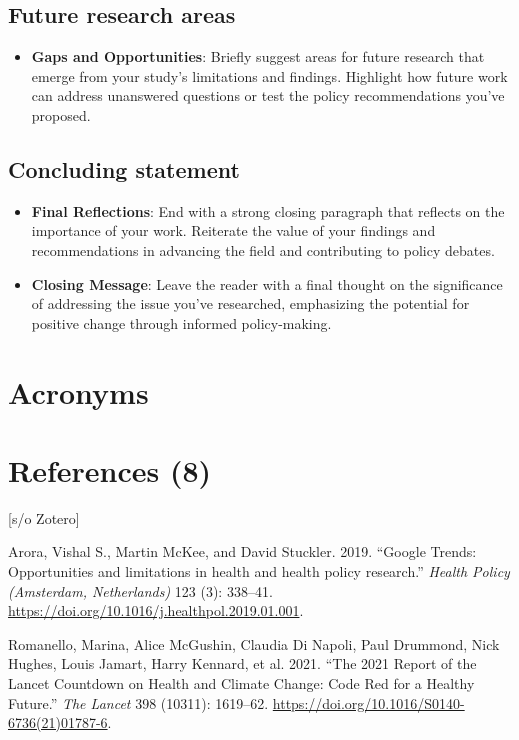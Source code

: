 \documentclass[
  12pt,
]{article}
\providecommand{\tightlist}{%
  \setlength{\itemsep}{0pt}\setlength{\parskip}{0pt}}\usepackage{longtable,booktabs,array}
\newlength{\cslhangindent}
\newenvironment{CSLReferences}[2] %
 {\begin{list}{}{%
  \setlength{\itemindent}{0pt}
  \setlength{\leftmargin}{0pt}
  \setlength{\parsep}{0pt}
  \ifodd #1
   \setlength{\leftmargin}{\cslhangindent}
   \setlength{\itemindent}{-1\cslhangindent}
  \fi
  \setlength{\itemsep}{#2\baselineskip}}}
 {\end{list}}
\begin{document}
\subsection{Future research areas}\label{future-research-areas}

\begin{itemize}
\tightlist
\item
  \textbf{Gaps and Opportunities}: Briefly suggest areas for future
  research that emerge from your study's limitations and findings.
  Highlight how future work can address unanswered questions or test the
  policy recommendations you've proposed.
\end{itemize}

\subsection{Concluding statement}\label{concluding-statement}

\begin{itemize}
\item
  \textbf{Final Reflections}: End with a strong closing paragraph that
  reflects on the importance of your work. Reiterate the value of your
  findings and recommendations in advancing the field and contributing
  to policy debates.
\item
  \textbf{Closing Message}: Leave the reader with a final thought on the
  significance of addressing the issue you've researched, emphasizing
  the potential for positive change through informed policy-making.
\end{itemize}

\section{Acronyms}\label{acronyms}

\section{References (8)}\label{references-8}

{[}s/o Zotero{]}

\label{refs}
\begin{CSLReferences}{1}{0}
Arora, Vishal S., Martin McKee, and David Stuckler. 2019. {``Google
Trends: Opportunities and limitations in health and health policy
research.''} \emph{Health Policy (Amsterdam, Netherlands)} 123 (3):
338--41. \url{https://doi.org/10.1016/j.healthpol.2019.01.001}.

Romanello, Marina, Alice McGushin, Claudia Di Napoli, Paul Drummond,
Nick Hughes, Louis Jamart, Harry Kennard, et al. 2021. {``The 2021
Report of the Lancet Countdown on Health and Climate Change: Code Red
for a Healthy Future.''} \emph{The Lancet} 398 (10311): 1619--62.
\url{https://doi.org/10.1016/S0140-6736(21)01787-6}.

\end{CSLReferences}
\end{document}
